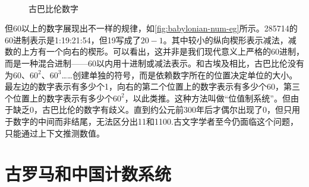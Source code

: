 \documentclass[b5paper]{ctexart}
\begin{document}
\begin{figure}[htbp]
 \centering
  \\
 \caption{古巴比伦数字}
\end{figure}

但60以上的数字展现出不一样的规律，如\cref{fig:babylonian-num-eg}所示。285714的60进制表示是1:19:21:54，但19写成了$20-1$。其中较小的纵向楔形表示减法，减数的上方有一个向右的楔形。可以看出，这并非是我们现代意义上严格的60进制，而是一种混合进制——60以内用十进制或减法表示。和古埃及相比，古巴比伦没有为$60$、$60^2$、$60^3$……创建单独的符号，而是依赖数字所在的位置决定单位的大小。最左边的数字表示有多少个1，向右的第二个位置上的数字表示有多少个60，第三个位置上的数字表示有多少个$60^2$，以此类推。这种方法叫做“位值制系统”。但由于缺乏0，古巴比伦的数字有歧义。直到约公元前300年后才偶尔出现了0，但只用于数字的中间而非结尾，无法区分出11和1100.古文字学者至今仍面临这个问题，只能通过上下文推测数值。

\section{古罗马和中国计数系统}
  
\end{document}

